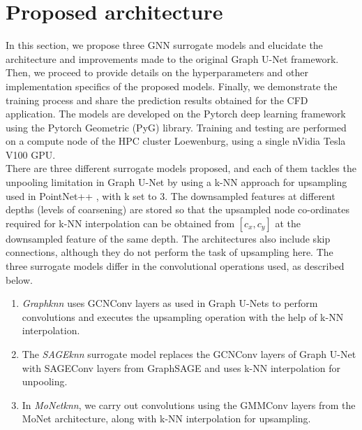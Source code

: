 \section{Proposed architecture}
\label{proparch}
In this section, we propose three GNN surrogate models and elucidate the architecture and improvements made to the original Graph U-Net framework. Then, we proceed to provide details on the hyperparameters and other implementation specifics of the proposed models. Finally, we demonstrate the training process and share the prediction results obtained for the CFD application. The models are developed on the Pytorch deep learning framework using the Pytorch Geometric (PyG) library. Training and testing are performed on a compute node of the \gls{HPC} cluster Loewenburg, using a single nVidia Tesla V100 GPU. \\
There are three different surrogate models proposed, and each of them tackles the unpooling limitation in Graph U-Net by using a \gls{k-NN} approach for upsampling used in PointNet++ \cite{pnpp}, with k set to 3. The downsampled features at different depths (levels of coarsening) are stored so that the upsampled node co-ordinates required for k-NN interpolation can be obtained from $[c_{x}, c_{y}]$ at the downsampled feature of the same depth. The architectures also include skip connections, although they do not perform the task of upsampling here. The three surrogate models differ in the convolutional operations used, as described below. 
\begin{enumerate}
    \item \textit{Graphknn} uses GCNConv layers as used in Graph U-Nets to perform convolutions and executes the upsampling operation with the help of k-NN interpolation. 
    \item The \textit{SAGEknn} surrogate model replaces the GCNConv layers of Graph U-Net with SAGEConv layers from GraphSAGE \cite{SAGE} and uses k-NN interpolation for unpooling. 
    \item In \textit{MoNetknn}, we carry out convolutions using the GMMConv layers from the MoNet \cite{MoNet} architecture, along with k-NN interpolation for upsampling. 

\end{enumerate}
